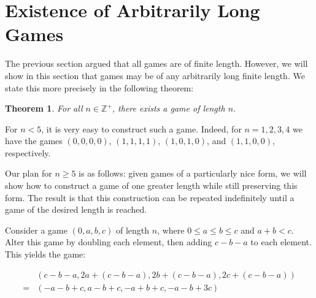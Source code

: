 \documentclass[12pt]{amsart}
\newtheorem{theorem}{Theorem}[section]
\newtheorem{lemma}[theorem]{Lemma}
\newcommand{\zp}{\mathbb{Z}^+}
\begin{document}
\section{Existence of Arbitrarily Long Games\label{sec:longgames}}

The previous section argued that all games are of finite length. However, we will show in this section that games may be of any arbitrarily long finite length. We state this more precisely in the following theorem:

\begin{theorem}
For all $n\in \zp$, there exists a game of length $n$.
\end{theorem}

For $n < 5$, it is very easy to construct such a game. Indeed, for $n=1,2,3,4$ we have the games $(0, 0, 0, 0)$, $(1, 1, 1, 1)$, $(1, 0, 1, 0)$, and $(1, 1, 0, 0)$, respectively.

Our plan for $n \geq 5$ is as follows: given games of a particularly nice form, we will show how to construct a game of one greater length while still preserving this form. The result is that this construction can be repeated indefinitely until a game of the desired length is reached.



Consider a game $(0, a, b, c)$ of length $n$, where $0\leq a\leq b\leq c$ and $a + b < c$. Alter this game by doubling each element, then adding $c - b - a$ to each element. This yields the game:

$$\begin{array}{cl}
& (c - b - a, 2a + (c - b - a), 2b + (c - b - a), 2c + (c - b - a)) \\
= & (-a - b + c, a - b + c, -a + b + c, -a - b + 3c)
\end{array}$$
\end{document}

